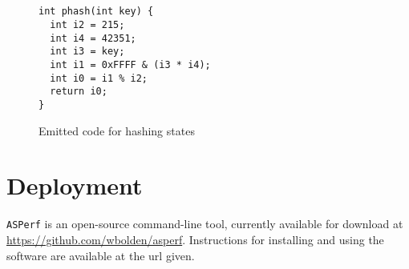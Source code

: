 \documentclass{article}
\begin{document}
\begin{figure}[H]
\begin{lstlisting}


int phash(int key) {
  int i2 = 215;
  int i4 = 42351;
  int i3 = key;
  int i1 = 0xFFFF & (i3 * i4);
  int i0 = i1 % i2;
  return i0;
}
\end{lstlisting}
\caption{Emitted code for hashing states}\label{visina8}
\end{figure}


\section{Deployment}

\texttt{ASPerf} is an open-source command-line tool, currently available for download at \href{https://github.com/wbolden/asperf}{https://github.com/wbolden/asperf}. Instructions for installing and using the software are available at the url given.
\end{document}

